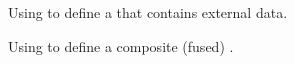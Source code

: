 \begin{figure}
  \caption{Using \libdrift to define a \dpart that contains external data.}
\end{figure}



\begin{figure}
  \caption{Using \libdrift to define a composite (fused) \dpart.}

\end{figure}




